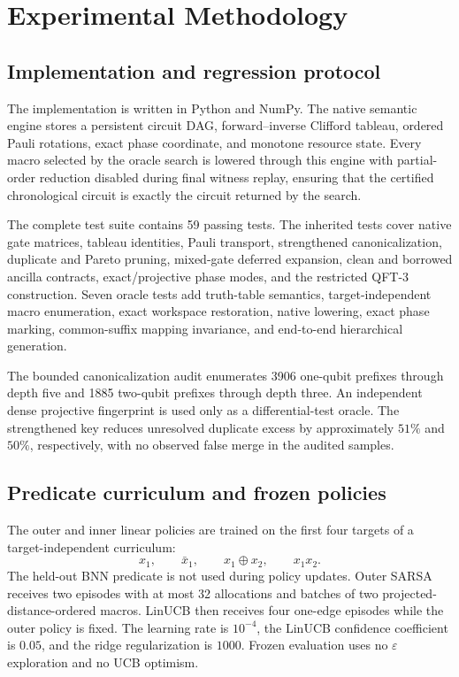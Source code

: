 \section{Experimental Methodology}
\label{sec:experiments}

\subsection{Implementation and regression protocol}

The implementation is written in Python and NumPy.  The native semantic engine stores a persistent circuit DAG, forward--inverse Clifford tableau, ordered Pauli rotations, exact phase coordinate, and monotone resource state.  Every macro selected by the oracle search is lowered through this engine with partial-order reduction disabled during final witness replay, ensuring that the certified chronological circuit is exactly the circuit returned by the search.

The complete test suite contains 59 passing tests.  The inherited tests cover native gate matrices, tableau identities, Pauli transport, strengthened canonicalization, duplicate and Pareto pruning, mixed-gate deferred expansion, clean and borrowed ancilla contracts, exact/projective phase modes, and the restricted QFT-3 construction.  Seven oracle tests add truth-table semantics, target-independent macro enumeration, exact workspace restoration, native lowering, exact phase marking, common-suffix mapping invariance, and end-to-end hierarchical generation.

The bounded canonicalization audit enumerates 3906 one-qubit prefixes through depth five and 1885 two-qubit prefixes through depth three.  An independent dense projective fingerprint is used only as a differential-test oracle.  The strengthened key reduces unresolved duplicate excess by approximately $51\%$ and $50\%$, respectively, with no observed false merge in the audited samples.

\subsection{Predicate curriculum and frozen policies}

The outer and inner linear policies are trained on the first four targets of a target-independent curriculum:
\begin{equation}
 x_1,\qquad \bar x_1,\qquad x_1\oplus x_2,\qquad x_1x_2.
\end{equation}
The held-out BNN predicate is not used during policy updates.  Outer SARSA receives two episodes with at most 32 allocations and batches of two projected-distance-ordered macros.  LinUCB then receives four one-edge episodes while the outer policy is fixed.  The learning rate is $10^{-4}$, the LinUCB confidence coefficient is $0.05$, and the ridge regularization is $1000$.  Frozen evaluation uses no $\varepsilon$ exploration and no UCB optimism.

